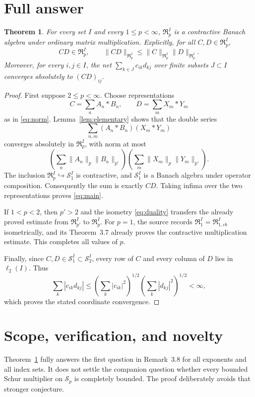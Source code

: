 \documentclass[11pt]{article}
\newtheorem{theorem}{Theorem}
\newcommand{\Rp}{\mathfrak R}
\newcommand{\Sp}{\mathcal S}
\newcommand{\had}{\mathbin{*}}
\begin{document}
\section{Full answer}

\begin{theorem}\label{thm:main}
For every set $I$ and every $1\leq p<\infty$, $\Rp_p^I$ is a
contractive Banach algebra under ordinary matrix multiplication.  Explicitly,
for all $C,D\in\Rp_p^I$,
\begin{equation}\label{eq:main}
 CD\in\Rp_p^I,
 \qquad \|CD\|_{\Rp_p^I}\leq
 \|C\|_{\Rp_p^I}\|D\|_{\Rp_p^I}.
\end{equation}
Moreover, for every $i,j\in I$, the net
$\sum_{k\in J}c_{ik}d_{kj}$ over finite subsets $J\subset I$ converges
absolutely to $(CD)_{ij}$.
\end{theorem}

\begin{proof}
First suppose $2\leq p<\infty$.  Choose representations
\[
 C=\sum_nA_n\had B_n,
 \qquad D=\sum_mX_m\had Y_m
\]
as in \eqref{eq:norm}.  Lemma~\ref{lem:elementary} shows that the double
series
\[
 \sum_{n,m}(A_n\had B_n)(X_m\had Y_m)
\]
converges absolutely in $\Rp_p^I$, with norm at most
\[
 \left(\sum_n\|A_n\|_p\|B_n\|_{p'}\right)
 \left(\sum_m\|X_m\|_p\|Y_m\|_{p'}\right).
\]
The inclusion $\Rp_p^I\hookrightarrow\Sp_1^I$ is contractive, and
$\Sp_1^I$ is a Banach algebra under operator composition.  Consequently the
sum is exactly $CD$.  Taking infima over the two representations proves
\eqref{eq:main}.

If $1<p<2$, then $p'>2$ and the isometry \eqref{eq:duality} transfers the
already proved estimate from $\Rp_{p'}^I$ to $\Rp_p^I$.  For $p=1$, the
source records $\Rp_1^I=\Rp_{1,cb}^I$ isometrically, and its Theorem~3.7
already proves the contractive multiplication estimate.  This completes all
values of $p$.

Finally, since $C,D\in\Sp_1^I\subset\Sp_2^I$, every row of $C$ and every
column of $D$ lies in $\ell_2(I)$.  Thus
\[
 \sum_k|c_{ik}d_{kj}|
 \leq \left(\sum_k|c_{ik}|^2\right)^{1/2}
      \left(\sum_k|d_{kj}|^2\right)^{1/2}<\infty,
\]
which proves the stated coordinate convergence.
\end{proof}

\section{Scope, verification, and novelty}

Theorem~\ref{thm:main} fully answers the first question in Remark~3.8 for
all exponents and all index sets.  It does not settle the companion question
whether every bounded Schur multiplier on $\Sp_p$ is completely bounded.
The proof deliberately avoids that stronger conjecture.
\end{document}
